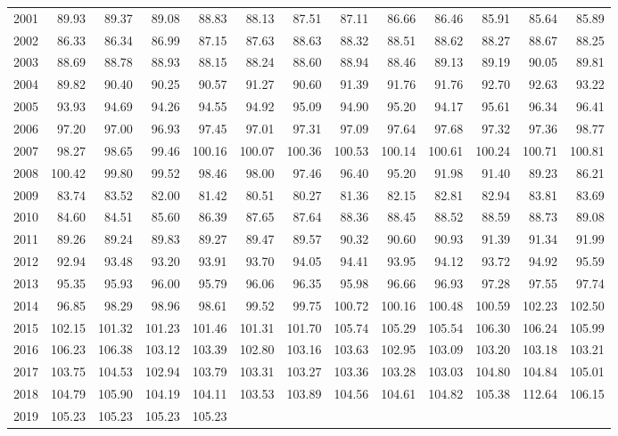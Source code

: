 \begin{longtable}{rrrrrrrrrrrrr}
  2001 & 89.93 & 89.37 & 89.08 & 88.83 & 88.13 & 87.51 & 87.11 & 86.66 & 86.46 & 85.91 & 85.64 & 85.89 \\ 
  2002 & 86.33 & 86.34 & 86.99 & 87.15 & 87.63 & 88.63 & 88.32 & 88.51 & 88.62 & 88.27 & 88.67 & 88.25 \\ 
  2003 & 88.69 & 88.78 & 88.93 & 88.15 & 88.24 & 88.60 & 88.94 & 88.46 & 89.13 & 89.19 & 90.05 & 89.81 \\ 
  2004 & 89.82 & 90.40 & 90.25 & 90.57 & 91.27 & 90.60 & 91.39 & 91.76 & 91.76 & 92.70 & 92.63 & 93.22 \\ 
  2005 & 93.93 & 94.69 & 94.26 & 94.55 & 94.92 & 95.09 & 94.90 & 95.20 & 94.17 & 95.61 & 96.34 & 96.41 \\ 
  2006 & 97.20 & 97.00 & 96.93 & 97.45 & 97.01 & 97.31 & 97.09 & 97.64 & 97.68 & 97.32 & 97.36 & 98.77 \\ 
  2007 & 98.27 & 98.65 & 99.46 & 100.16 & 100.07 & 100.36 & 100.53 & 100.14 & 100.61 & 100.24 & 100.71 & 100.81 \\ 
  2008 & 100.42 & 99.80 & 99.52 & 98.46 & 98.00 & 97.46 & 96.40 & 95.20 & 91.98 & 91.40 & 89.23 & 86.21 \\ 
  2009 & 83.74 & 83.52 & 82.00 & 81.42 & 80.51 & 80.27 & 81.36 & 82.15 & 82.81 & 82.94 & 83.81 & 83.69 \\ 
  2010 & 84.60 & 84.51 & 85.60 & 86.39 & 87.65 & 87.64 & 88.36 & 88.45 & 88.52 & 88.59 & 88.73 & 89.08 \\ 
  2011 & 89.26 & 89.24 & 89.83 & 89.27 & 89.47 & 89.57 & 90.32 & 90.60 & 90.93 & 91.39 & 91.34 & 91.99 \\ 
  2012 & 92.94 & 93.48 & 93.20 & 93.91 & 93.70 & 94.05 & 94.41 & 93.95 & 94.12 & 93.72 & 94.92 & 95.59 \\ 
  2013 & 95.35 & 95.93 & 96.00 & 95.79 & 96.06 & 96.35 & 95.98 & 96.66 & 96.93 & 97.28 & 97.55 & 97.74 \\ 
  2014 & 96.85 & 98.29 & 98.96 & 98.61 & 99.52 & 99.75 & 100.72 & 100.16 & 100.48 & 100.59 & 102.23 & 102.50 \\ 
  2015 & 102.15 & 101.32 & 101.23 & 101.46 & 101.31 & 101.70 & 105.74 & 105.29 & 105.54 & 106.30 & 106.24 & 105.99 \\ 
  2016 & 106.23 & 106.38 & 103.12 & 103.39 & 102.80 & 103.16 & 103.63 & 102.95 & 103.09 & 103.20 & 103.18 & 103.21 \\ 
  2017 & 103.75 & 104.53 & 102.94 & 103.79 & 103.31 & 103.27 & 103.36 & 103.28 & 103.03 & 104.80 & 104.84 & 105.01 \\ 
  2018 & 104.79 & 105.90 & 104.19 & 104.11 & 103.53 & 103.89 & 104.56 & 104.61 & 104.82 & 105.38 & 112.64 & 106.15 \\ 
  2019 & 105.23 & 105.23 & 105.23 & 105.23 &  &  &  &  &  &  &  &  \\ 
   \hline
\hline
\end{longtable}
